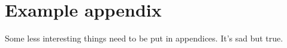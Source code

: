 \chapter{Example appendix}
Some less interesting things need to be put in appendices.
\newpage
It's sad but true.